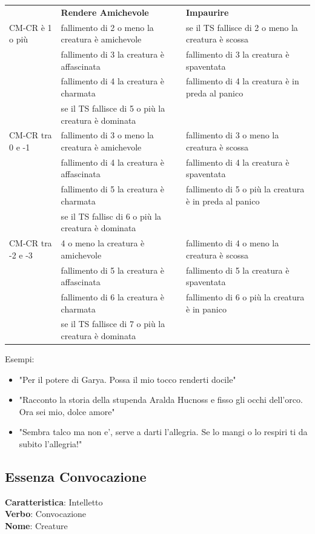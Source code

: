 \documentclass[a4paper,11pt,twoside,openany]{book}
\begin{document}
\begin{tabular}{L{2.5cm} L{7cm} L{7cm}}
	\toprule
  & \textbf{Rendere Amichevole}         & \textbf{Impaurire}\tabularnewline
   CM-CR è 1 o più   & fallimento di 2 o meno la creatura è amichevole     & se il TS fallisce di 2 o meno la creatura è scossa\tabularnewline
   & fallimento di 3 la creatura è affascinata     & fallimento di 3 la creatura è spaventata\tabularnewline
   & fallimento di 4 la creatura è charmata        & fallimento di 4 la creatura è in preda al panico\tabularnewline
  & se il TS fallisce di 5 o più la creatura è dominata         & \tabularnewline
 CM-CR tra 0 e -1  & fallimento di 3 o meno la creatura è amichevole   & fallimento di 3 o meno la creatura è scossa\tabularnewline
 & fallimento di 4 la creatura è affascinata  & fallimento di 4 la creatura è spaventata\tabularnewline
 & fallimento di 5 la creatura è charmata     & fallimento di 5 o più la creatura è in preda al panico\tabularnewline
 & se il TS fallisc di 6 o più la creatura è dominata          & \tabularnewline
 CM-CR tra -2 e -3 & 4 o meno la creatura è amichevole  & fallimento di 4 o meno la creatura è scossa\tabularnewline
& fallimento di 5 la creatura è affascinata      & fallimento di 5 la creatura è spaventata\tabularnewline
& fallimento di 6 la creatura è charmata         & fallimento di 6 o più la creatura è in panico\tabularnewline
 & se il TS fallisce di 7 o più la creatura è dominata & \tabularnewline
\end{tabular}


\bigskip

Esempi:
\begin{itemize}
	\item
	      "Per il potere di Garya. Possa il mio tocco renderti docile"
	\item
	      "Racconto la storia della stupenda Aralda Hucnoss e fisso gli occhi dell'orco. Ora sei mio, dolce amore"
	\item
	      "Sembra talco ma non e', serve a darti l'allegria. Se lo mangi o lo respiri ti da subito l'allegria!"
\end{itemize}

\pagebreak

\subsection{Essenza Convocazione}

\textbf{Caratteristica}: Intelletto\\
\textbf{Verbo}: Convocazione\\
\textbf{Nome}: Creature\\
\end{document}
